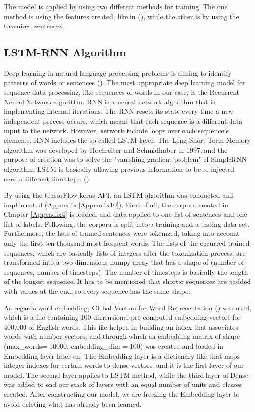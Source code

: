The model is applied by using two different methods for training. The one method is using the features created, like in (\cite{Lawrence2016}), while the other is by using the tokenized sentences.

\subsection{LSTM-RNN Algorithm}

Deep learning in natural-language processing problems is aiming to identify patterns of words or sentences (\cite{Chollet2017}). The most appropriate deep learning model for sequence data processing, like sequences of words in our case, is the Recurrent Neural Network algorithm. RNN is a neural network algorithm that is implementing internal iterations. The RNN resets its state every time a new independent process occurs, which means that each sequence is a different data input to the network. However, network include loops over each sequence's elements. RNN includes the so-called LSTM layer. The Long Short-Term Memory algorithm was developed by Hochreiter and Schmidhuber in 1997, and the purpose of creation was to solve the "vanishing-gradient problem" of SimpleRNN algorithm. LSTM is basically allowing previous information to be re-injected across different timesteps. (\cite{Chollet2017})

By using the tensorFlow keras API, an LSTM algorithm was conducted and implemented (Appendix \ref{Appendix10}). First of all, the corpora created in Chapter \ref{Appendix4} is loaded, and data applied to one list of sentences and one list of labels. Following, the corpora is split into a training and a testing data-set. Furthermore, the lists of trained sentences were tokenized, taking into account only the first ten-thousand most frequent words. The lists of the occurred trained sequences, which are basically lists of integers after the tokenization process, are transformed into a two-dimensions numpy array that has a shape of (number of sequences, number of timesteps). The number of timesteps is basically the length of the longest sequence. It has to be mentioned that shorter sequences are padded with values at the end, so every sequence has the same shape.

As regards word embedding, Global Vectors for Word Representation (\cite{glove}) was used, which is a file containing 100-dimensional pre-computed embedding vectors for 400,000 of English words. This file helped in building an index that associates words with number vectors, and through which an embedding matrix of shape (max\_words= 10000, embedding\_dim = 100) was created and loaded in Embedding layer later on. The Embedding layer is a dictionary-like that maps integer indexes for certain words to dense vectors, and it is the first layer of our model. The second layer applies to LSTM method, while the third layer of Dense was added to end our stack of layers with an equal number of units and classes created. After constructing our model, we are freezing the Embedding layer to avoid deleting what has already been learned. 

